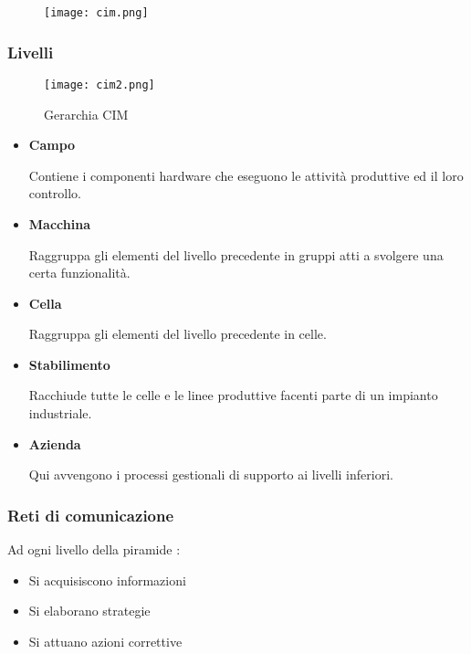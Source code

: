 \documentclass{article}
\begin{document}
\begin{figure}[ht]
    \centering
    \texttt{[image: cim.png]}
\end{figure}

\subsubsection{Livelli}

\begin{figure}[ht]
    \centering
    \texttt{[image: cim2.png]}
    \caption{Gerarchia CIM}
\end{figure}

\begin{itemize}
    \item \textbf{Campo}

        Contiene i componenti hardware che eseguono le attività produttive ed il loro controllo.

    \item \textbf{Macchina}

        Raggruppa gli elementi del livello precedente in gruppi atti a svolgere una certa funzionalità.

    \item \textbf{Cella}

        Raggruppa gli elementi del livello precedente in celle.

    \item \textbf{Stabilimento}

        Racchiude tutte le celle e le linee produttive facenti parte di un impianto industriale.

    \item \textbf{Azienda}

        Qui avvengono i processi gestionali di supporto ai livelli inferiori.\newline
    
\end{itemize}

\subsubsection{Reti di comunicazione}

Ad ogni livello della piramide :
\begin{itemize}
    \item Si acquisiscono informazioni
    \item Si elaborano strategie
    \item Si attuano azioni correttive
\end{itemize}
\end{document}
